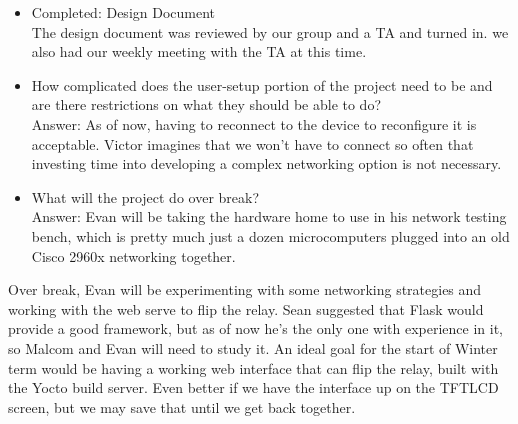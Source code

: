 \documentclass[letterpaper,10pt]{article}
\begin{document}
\begin{itemize}
    \item Completed: Design Document\\
	The design document was reviewed by our group and a TA and turned in. 
	we also had our weekly meeting with the TA at this time.  
    \item How complicated does the user-setup portion of the project need
	to be and are there restrictions on what they should be able to do?\\
        Answer: As of now, having to reconnect to the device to reconfigure 
	it is acceptable. Victor imagines that we won't have to connect so
	often that investing time into developing a complex networking option
	is not necessary.
    \item What will the project do over break?\\
        Answer: Evan will be taking the hardware home to use in his network
	testing bench, which is pretty much just a dozen microcomputers 
	plugged into an old Cisco 2960x networking together. 
\end{itemize}

Over break, Evan will be experimenting with some networking strategies and
working with the web serve to flip the relay. Sean suggested that Flask would
provide a good framework, but as of now he's the only one with experience in 
it, so Malcom and Evan will need to study it. An ideal goal for the start of 
Winter term would be having a working web interface that can flip the relay,
built with the Yocto build server. Even better if we have the interface
up on the TFTLCD screen, but we may save that until we get back together.
\end{document}
